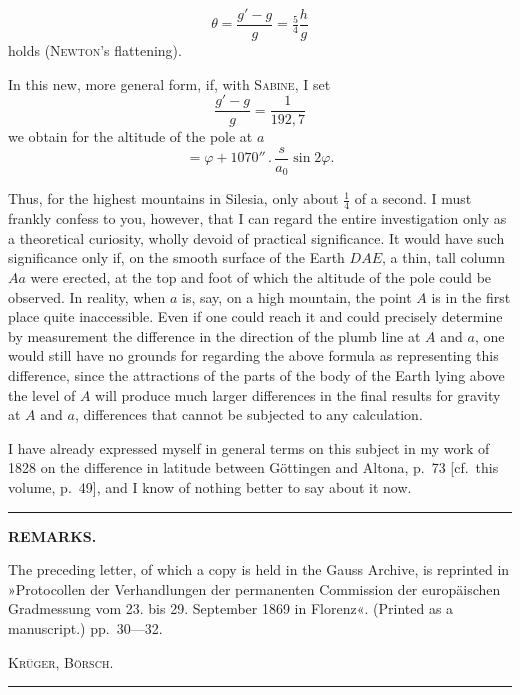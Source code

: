 \begingroup
\setlength{\abovedisplayskip}{6pt}
\setlength{\belowdisplayskip}{6pt}
\setlength{\abovedisplayshortskip}{3pt}
\setlength{\belowdisplayshortskip}{4pt}

\par\clearpage
\noindent{}\makebox[12mm][r]{}\par\medskip

\[
\theta=\frac{g'-g}{g}=\tfrac54\frac hg
\]
\noindent holds (\textsc{Newton}'s flattening).

In this new, more general form, if, with \textsc{Sabine}, I set
\[
\frac{g'-g}{g}=\frac1{192{,}7}
\]
\noindent we obtain for the altitude of the pole at \(a\)
\[
=\varphi+1070''\,.\,\frac{s}{a_0}\sin 2\varphi.
\]

Thus, for the highest mountains in Silesia, only about \(\tfrac14\) of a second. I must
frankly confess to you, however, that I can regard the entire investigation only
as a theoretical curiosity, wholly devoid of practical significance.
It would have such significance only if, on the smooth surface of the Earth
\(DAE\), a thin, tall column \(Aa\) were erected, at the top
and foot of which the altitude of the pole could be observed. In reality, when
\(a\) is, say, on a high mountain, the point \(A\) is in the first place
quite inaccessible. Even if one could reach it and could
precisely determine by measurement the difference in the direction of the plumb line at \(A\) and \(a\),
one would still have no grounds for regarding the above formula
as representing this difference, since the attractions of the parts
of the body of the Earth lying above the level of \(A\) will produce much larger differences
in the final results for gravity
at \(A\) and \(a\), differences that cannot be subjected to any calculation.

I have already expressed myself in general terms on this subject in my work
of 1828 on the difference in latitude between Göttingen and Altona, p.~73 [cf.\
this volume, p.~49], and I know of nothing better to say
about it now.

\begin{center}\rule{.18\textwidth}{.4pt}\end{center}
{\small
\begin{center}\textbf{REMARKS.}\end{center}
The preceding letter, of which a copy is held in the Gauss Archive, is reprinted in
»Protocollen der Verhandlungen der permanenten Commission der europäischen Gradmessung vom 23. bis
29. September 1869 in Florenz«. (Printed as a manuscript.) pp.~30---32.
\par\hfill\textsc{Krüger, Börsch.}\hspace{.06\textwidth}\par
}
\begin{center}\rule{.24\textwidth}{.4pt}\end{center}

